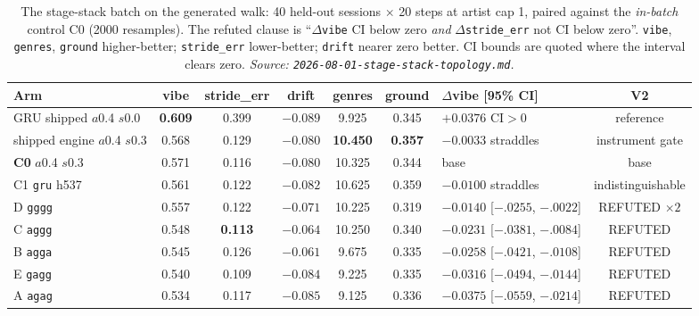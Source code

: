 \documentclass[11pt]{article}
\newcommand{\best}[1]{\textbf{#1}}
\begin{document}
\begin{table}[ht]
  \centering
  \caption{The stage-stack batch on the generated walk: \num{40} held-out sessions
  $\times$ \num{20} steps at artist cap 1, paired against the \emph{in-batch}
  control C0 (\num{2000} resamples). The refuted clause is
  ``$\Delta$\texttt{vibe} CI below zero \emph{and} $\Delta$\texttt{stride\_err}
  not CI below zero''. \texttt{vibe}, \texttt{genres}, \texttt{ground}
  higher-better; \texttt{stride\_err} lower-better; \texttt{drift} nearer zero
  better. CI bounds are quoted where the interval clears zero.
  \emph{Source: \texttt{2026-08-01-stage-stack-topology.md}.}}
  \label{tab:stagestack-s2}
  {\footnotesize\setlength{\tabcolsep}{2.6pt}\begin{tabular}{lccccclc}
    \toprule
    Arm & vibe & stride\_err & drift & genres & ground & $\Delta$vibe [95\% CI] & V2 \\
    \midrule
    GRU shipped $a$0.4 $s$0.0 & \best{0.609} & 0.399 & $-0.089$ & 9.925 & 0.345 & $+0.0376$ CI$>$0 & reference \\
    shipped engine $a$0.4 $s$0.3 & 0.568 & 0.129 & $-0.080$ & \best{10.450} & \best{0.357} & $-0.0033$ straddles & instrument gate \\
    \textbf{C0} $a$0.4 $s$0.3 & 0.571 & 0.116 & $-0.080$ & 10.325 & 0.344 & base & base \\
    C1 \texttt{gru} h537 & 0.561 & 0.122 & $-0.082$ & 10.625 & 0.359 & $-0.0100$ straddles & indistinguishable \\
    D \texttt{gggg} & 0.557 & 0.122 & $-0.071$ & 10.225 & 0.319 & $-0.0140$ [$-.0255$, $-.0022$] & REFUTED $\times2$ \\
    C \texttt{aggg} & 0.548 & \best{0.113} & $-0.064$ & 10.250 & 0.340 & $-0.0231$ [$-.0381$, $-.0084$] & REFUTED \\
    B \texttt{agga} & 0.545 & 0.126 & \best{$-0.061$} & 9.675 & 0.335 & $-0.0258$ [$-.0421$, $-.0108$] & REFUTED \\
    E \texttt{gagg} & 0.540 & 0.109 & $-0.084$ & 9.225 & 0.335 & $-0.0316$ [$-.0494$, $-.0144$] & REFUTED \\
    A \texttt{agag} & 0.534 & 0.117 & $-0.085$ & 9.125 & 0.336 & $-0.0375$ [$-.0559$, $-.0214$] & REFUTED \\
    \bottomrule
  \end{tabular}}
\end{table}
\end{document}
